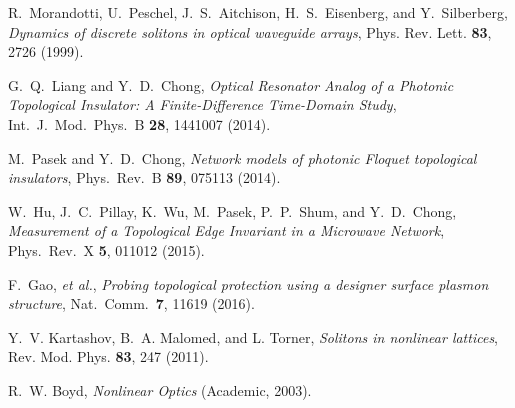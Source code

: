 \documentclass[aps,prx,twocolumn,superscriptaddress]{revtex4-1}
\begin{document}
\begin{thebibliography}{99}
R.~Morandotti, U.~Peschel, J.~S.~Aitchison, H.~S.~Eisenberg, and Y.~Silberberg, {\it Dynamics of discrete solitons in optical waveguide arrays}, Phys. Rev. Lett. {\bf 83}, 2726 (1999).

 G.~Q.~Liang and Y.~D.~Chong, \textit{Optical Resonator Analog of a Photonic Topological Insulator: A Finite-Difference Time-Domain Study}, Int.~J.~Mod.~Phys.~B \textbf{28}, 1441007 (2014).

 M.~Pasek and Y.~D.~Chong, \textit{Network models of photonic Floquet topological insulators}, Phys.~Rev.~B \textbf{89}, 075113 (2014).

 W.~Hu, J.~C.~Pillay, K.~Wu, M.~Pasek, P.~P.~Shum, and Y.~D.~Chong, \textit{Measurement of a Topological Edge Invariant in a Microwave Network}, Phys.~Rev.~X \textbf{5}, 011012 (2015).

 F.~Gao, \textit{et al.}, \textit{Probing topological protection using a designer surface plasmon structure}, Nat.~Comm.~\textbf{7}, 11619 (2016).

Y.~V. Kartashov, B.~A. Malomed, and L. Torner, {\it Solitons in nonlinear lattices}, Rev. Mod. Phys. {\bf 83}, 247 (2011).

R.~W. Boyd, {\it Nonlinear Optics} (Academic, 2003).

\end{thebibliography}
\end{document}
